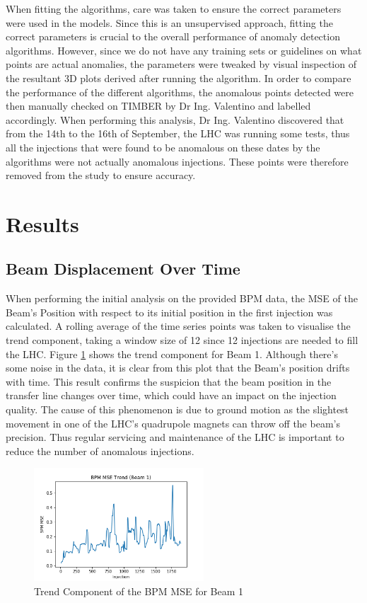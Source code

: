 \documentclass[conference, a4paper]{IEEEtran}
\begin{document}
	\par When fitting the algorithms, care was taken to ensure the correct parameters were used in the models. Since this is an unsupervised approach, fitting the correct parameters is crucial to the overall performance of anomaly detection algorithms. However, since we do not have any training sets or guidelines on what points are actual anomalies, the parameters were tweaked by visual inspection of the resultant 3D plots derived after running the algorithm. In order to compare the performance of the different algorithms, the anomalous points detected were then manually checked on TIMBER by Dr Ing. Valentino and labelled accordingly. When performing this analysis, Dr Ing. Valentino discovered that from the 14th to the 16th of September, the LHC was running some tests, thus all the injections that were found to be anomalous on these dates by the algorithms were not actually anomalous injections. These points were therefore removed from the study to ensure accuracy. 
	
	\section{Results}
	\subsection{Beam Displacement Over Time}
	\par When performing the initial analysis on the provided BPM data, the MSE of the Beam's Position with respect to its initial position in the first injection was calculated. A rolling average of the time series points was taken to visualise the trend component, taking a window size of 12 since 12 injections are needed to fill the LHC. Figure \ref{fig::BPM_MSE_Trend_B1} shows the trend component for Beam 1. Although there's some noise in the data, it is clear from this plot that the Beam's position drifts with time. This result confirms the suspicion that the beam position in the transfer line changes over time, which could have an impact on the injection quality. The cause of this phenomenon is due to ground motion as the slightest movement in one of the LHC's quadrupole magnets can throw off the beam's precision. Thus regular servicing and maintenance of the LHC is important to reduce the number of anomalous injections.
	
	\begin{figure}[!t]
		\centering
		\includegraphics[width=2.5in]{BPM_MSE_Trend_B1}
		\caption[BPM MSE Trend B1]{Trend Component of the BPM MSE for Beam 1}
		\label{fig::BPM_MSE_Trend_B1}
	\end{figure}
	
\end{document}
